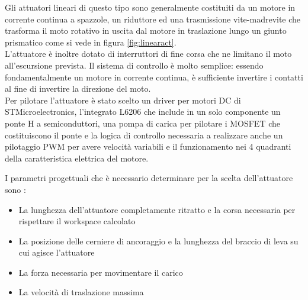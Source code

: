 \documentclass[%
corpo=11pt,
twoside,
 stile=classica,
oldstyle,
greek,%
]{toptesi}
\begin{document}
	Gli attuatori lineari di questo tipo sono generalmente costituiti da un motore in corrente continua a spazzole, un riduttore ed una trasmissione vite-madrevite che trasforma il moto rotativo in uscita dal motore in traslazione lungo un giunto prismatico come si vede in figura \ref{fig:linearact}.\\
	L'attuatore è inoltre dotato di interruttori di fine corsa che ne limitano il moto all'escursione prevista. Il sistema di controllo è molto semplice: essendo fondamentalmente un motore in corrente continua, è sufficiente invertire i contatti al fine di invertire la direzione del moto.\\ 
	Per pilotare l'attuatore è stato scelto un driver per motori DC di STMicroelectronics, l'integrato L6206 che include in un solo componente un ponte H a semiconduttori, una pompa di carica per pilotare i MOSFET che costituiscono il ponte e la logica di controllo necessaria a realizzare anche un pilotaggio PWM per avere velocità variabili e il funzionamento nei 4 quadranti della caratteristica elettrica del motore. 
	
	I parametri progettuali che è necessario determinare per la scelta dell'attuatore sono :
	\begin{itemize}
		\item La lunghezza dell'attuatore completamente ritratto e la corsa necessaria per rispettare il workspace calcolato
		\item La posizione delle cerniere di ancoraggio e la lunghezza del braccio di leva su cui agisce l'attuatore
		\item La forza necessaria per movimentare il carico 
		\item La velocità di traslazione massima 
	\end{itemize}
	
\end{document}
